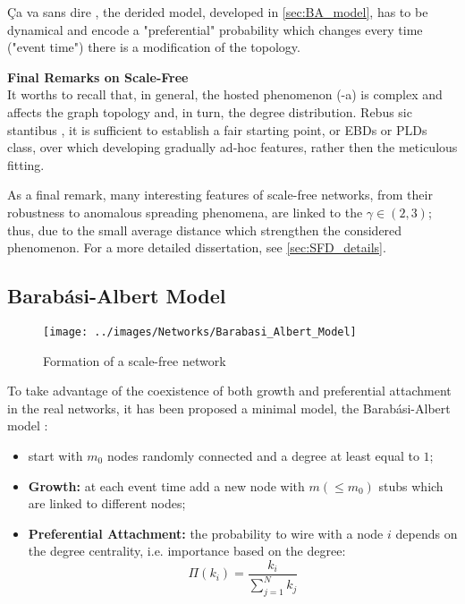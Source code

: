 \documentclass[a4paper,12pt,twoside]{book} %
\theoremstyle{definition}
\begin{document}
Ça va sans dire \label{cit:A.Marzo}, the derided model, developed in \autoref{sec:BA_model}, has to be dynamical and encode a "preferential" probability which changes every time ("event time") there is a modification of the topology. 

{\large \textbf{Final Remarks on Scale-Free}} \\
It worths to recall that, in general, the hosted phenomenon (-a) is complex and affects the graph topology and, in turn, the degree distribution. Rebus sic stantibus \label{cit:D.Massa}, it is sufficient to establish a fair starting point, or EBDs or PLDs class, over which developing gradually ad-hoc features, rather then the meticulous fitting.

As a final remark, many interesting features of scale-free networks, from their robustness to anomalous spreading phenomena, are linked to the $\gamma \in (2,3)$; thus, due to the small average distance which strengthen the considered phenomenon.
For a more detailed dissertation, see \autoref{sec:SFD_details}.

\newpage
\subsection{Barabási-Albert Model}
\begin{figure}[ht]
	\texttt{[image: ../images/Networks/Barabasi\_Albert\_Model]}
	\centering
	\caption{Formation of a scale-free network \cite{Barabasi:2009_SF_DecadeBeyond}}
	\label{fig:LCD_growth}
\end{figure}

\label{sec:BA_model}
To take advantage of the coexistence of both growth and preferential attachment in the real networks, it has been proposed a minimal model, the Barabási-Albert model \cite{barabasi::2016networkbook}:
\begin{itemize}
	\item start with $m_0$ nodes randomly connected and a degree at least equal to $1$;
	\item \textbf{Growth:} at each event time add a new node with $m(\leq  m_0)$ stubs which are linked to different nodes;
	\item \textbf{Preferential Attachment:} the probability to wire with a node $i$ depends on the degree centrality, i.e. importance based on the degree:
	\begin{equation}
		\Pi(k_i) = \frac{k_i}{\sum_{j = 1}^N k_j}
	\end{equation}
\end{itemize}
\end{document}
